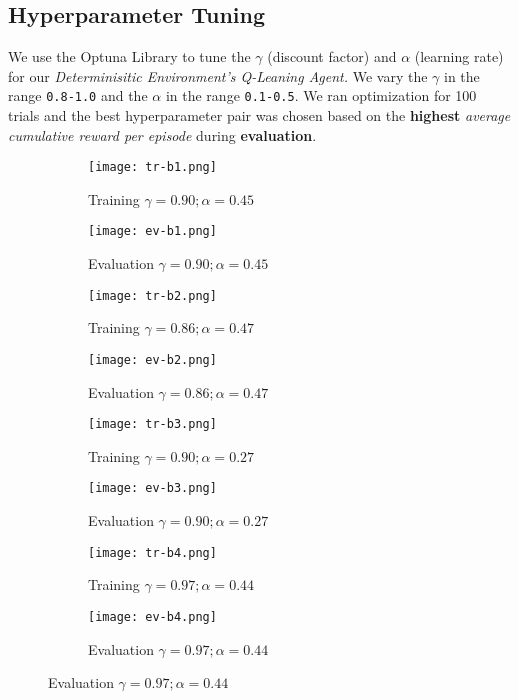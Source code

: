 \documentclass{article} %
\begin{document}
\subsection{Hyperparameter Tuning}
We use the Optuna Library \cite{akiba2019optuna} to tune the $\gamma$ (discount factor) and
$\alpha$ (learning rate) for our \textit{Determinisitic Environment's Q-Leaning Agent.} We
vary the $\gamma$ in the range \verb|0.8-1.0| and the $\alpha$ in the range \verb|0.1-0.5|.
We ran optimization for 100 trials and the best hyperparameter pair was chosen based on the
\textbf{highest} \textit{average cumulative reward per episode} during \textbf{evaluation}.  
\vfill
\begin{figure}[ht]
    \begin{subfigure}{.45\textwidth}
        \centering
        \texttt{[image: tr-b1.png]}
        \caption{Training $\gamma=0.90; \alpha=0.45$}
        \label{fig:trial1}
    \end{subfigure}
    \hfill
    \begin{subfigure}{.45\textwidth}
        \centering
        \texttt{[image: ev-b1.png]}
        \caption{Evaluation $\gamma=0.90; \alpha=0.45$}
        \label{fig:ev1}
    \end{subfigure}

    \begin{subfigure}{.45\textwidth}
        \centering
        \texttt{[image: tr-b2.png]}
        \caption{Training $\gamma=0.86; \alpha=0.47$}
        \label{fig:trial2}
    \end{subfigure}
    \hfill
    \begin{subfigure}{.45\textwidth}
        \centering
        \texttt{[image: ev-b2.png]}
        \caption{Evaluation $\gamma=0.86; \alpha=0.47$}
        \label{fig:ev2}
    \end{subfigure}

    \begin{subfigure}{.45\textwidth}
        \centering
        \texttt{[image: tr-b3.png]}
        \caption{Training $\gamma=0.90; \alpha=0.27$}
        \label{fig:trial3}
    \end{subfigure}
    \hfill
    \begin{subfigure}{.45\textwidth}
        \centering
        \texttt{[image: ev-b3.png]}
        \caption{Evaluation $\gamma=0.90; \alpha=0.27$}
        \label{fig:ev3}
    \end{subfigure}

    \begin{subfigure}{.45\textwidth}
        \centering
        \texttt{[image: tr-b4.png]}
        \caption{Training $\gamma=0.97; \alpha=0.44$}
        \label{fig:trial4}
    \end{subfigure}
    \hfill
    \begin{subfigure}{.45\textwidth}
        \centering
        \texttt{[image: ev-b4.png]}
        \caption{Evaluation $\gamma=0.97; \alpha=0.44$}
        \label{fig:ev4}
    \end{subfigure}
\end{figure}
\end{document}
